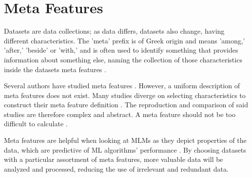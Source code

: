 \chapter{Meta Features}
\label{chap:mf}
Datasets are data collections; as data differs, datasets also change, having different characteristics. The 'meta' prefix is of Greek origin and means 'among,' 'after,' 'beside' or 'with,' and is often used to identify something that provides information about something else, naming the collection of those characteristics inside the datasets meta features \citep{binder2015analysis}.

Several authors have studied meta features \citep{reif2014automatic}. However, a uniform description of meta features does not exist. Many studies diverge on selecting characteristics to construct their meta feature definition \citep{rivolli2019characterizing}. The reproduction and comparison of said studies are therefore complex and abstract. A meta feature should not be too difficult to calculate \citep{10.1007/11526018_45}.

Meta features are helpful when looking at MLMs as they depict properties of the data, which are predictive of ML algorithms' performance \citep{9640223}. By choosing datasets with a particular assortment of meta features, more valuable data will be analyzed and processed, reducing the use of irrelevant and redundant data.

